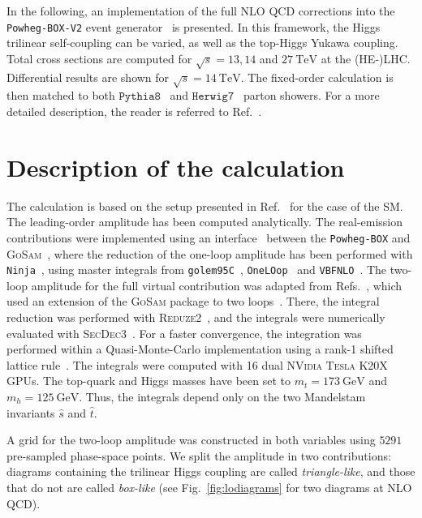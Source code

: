 \documentclass[a4paper]{jpconf}
\newcommand{\GeV}{\ensuremath{\mathrm{\:GeV}}}
\newcommand{\TeV}{\ensuremath{\mathrm{\:TeV}}}
\newcommand{\pythia}{\texttt{Pythia8}}
\newcommand{\herwig}{\texttt{Herwig7}}
\begin{document}
In the following, an implementation of the full NLO QCD corrections into the \texttt{Powheg-BOX-V2} event generator~\cite{Nason:2004rx,Frixione:2007vw,Alioli:2010xd} is presented. In this framework, the Higgs trilinear self-coupling can be varied, as well as the top-Higgs Yukawa coupling. Total cross sections are computed for $\sqrt{s}=13,14$ and $27 \TeV$ at the (HE-)LHC. Differential results are shown for $\sqrt{s}=14 \TeV$. The fixed-order calculation is then matched to both $\pythia$~\cite{Sjostrand:2014zea} and $\herwig$~\cite{Bellm:2015jjp,Bellm:2017bvx} parton showers. For a more detailed description, the reader is referred to Ref.~\cite{Heinrich:2019bkc}.

\section{Description of the calculation}

The calculation is based on the setup presented in Ref.~\cite{Heinrich:2017kxx} for the case of the SM. The leading-order amplitude has been computed analytically. The real-emission contributions were implemented using an interface~\cite{Luisoni:2013kna} between the \texttt{Powheg-BOX} and \textsc{GoSam}~\cite{Cullen:2011ac,Cullen:2014yla}, 
where the reduction of the one-loop amplitude has been performed with \texttt{Ninja}~\cite{Peraro:2014cba}, using master integrals from 
\texttt{golem95C}~\cite{Binoth:2008uq,Cullen:2011kv}, \texttt{OneLOop}~\cite{vanHameren:2010cp} and \texttt{VBFNLO}~\cite{Arnold:2008rz,Baglio:2014uba}.
The two-loop amplitude for the full virtual contribution was adapted from Refs.~\cite{Borowka:2016ehy,Borowka:2016ypz}, which used an extension of the \textsc{GoSam} package to two loops~\cite{Jones:2016bci}. There, the integral reduction was performed with \textsc{Reduze2}~\cite{vonManteuffel:2012np}, and the integrals were numerically evaluated with \textsc{SecDec3}~\cite{Borowka:2015mxa}. For a faster convergence, the integration was performed within a Quasi-Monte-Carlo implementation using a rank-1 shifted lattice rule~\cite{Borowka:2018goh,Jones:theseproceedings}. The integrals were computed with 16 dual \textsc{NVidia Tesla K20X} GPUs. The top-quark and Higgs masses have been set to $m_t=173 \GeV$ and $m_h = 125 \GeV$. Thus, the integrals depend only on the two Mandelstam invariants $\hat{s}$ and $\hat{t}$.

A grid for the two-loop amplitude was constructed in both variables using $5291$ pre-sampled phase-space points. %
We split the amplitude in two contributions: diagrams containing the trilinear Higgs coupling are called \textit{triangle-like}, and those that do not are called \textit{box-like} (see Fig.~\ref{fig:lodiagrams} for two diagrams at NLO QCD). 
\end{document}
